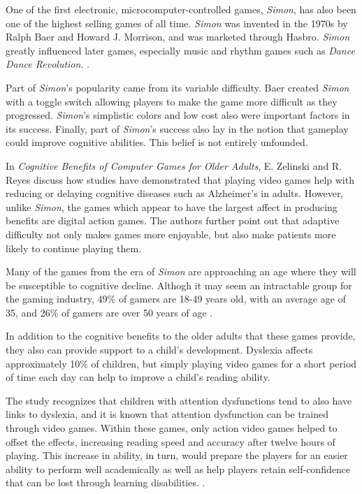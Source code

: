One of the first electronic, microcomputer-controlled games, \textit{Simon},
has also been one of the highest selling games of all time.  \textit{Simon}
was invented in the 1970s by Ralph Baer and Howard J. Morrison, and
was marketed through Hasbro.  \textit{Simon} greatly influenced later games,
especially music and rhythm games such as \textit{Dance Dance Revolution}.
\citep{austin2016}.

Part of \textit{Simon}'s popularity came from its variable difficulty.  Baer
created \textit{Simon} with a toggle switch allowing players to make the game
more difficult as they progressed.  \textit{Simon}'s simplistic colors and low
cost also were important factors in its success.  Finally, part of
\textit{Simon}'s success also lay in the notion that gameplay could improve
cognitive abilities.  This belief is not entirely unfounded.

In \textit{Cognitive Benefits of Computer Games for Older Adults},
E. Zelinski and R. Reyes discuss how studies have demonstrated that playing video
games help with reducing or delaying cognitive diseases such as
Alzheimer’s in adults.  However, unlike \textit{Simon}, the games which appear
to have the largest affect in producing benefits are digital action games.
The authors further point out that adaptive difficulty not only makes
games more enjoyable, but also make patients more likely to continue
playing them.

Many of the games from the era of \textit{Simon} are approaching an age
where they will be susceptible to cognitive decline.  Althogh it
may seem an intractable group for the gaming industry, 49\% of gamers
are 18-49 years old, with an average age of 35, and 26\% of gamers are
over 50 years of age \citep{zelinski2009}.

In addition to the cognitive benefits to the older adults that these games
provide, they also can provide support to a child's development. Dyslexia
affects approximately 10\% of children, but simply playing video games for a
short period of time each day can help to improve a child's reading ability.

The study recognizes that children with attention dysfunctions tend to also
have links to dyslexia, and it is known that attention dysfunction can be
trained through video games. Within these games, only action video games helped
to offset the effects, increasing reading speed and accuracy after twelve hours
of playing. This increase in ability, in turn, would prepare the players for an
easier ability to perform well academically as well as help players retain
self-confidence that can be lost through learning disabilities.
\citep{franceschini2013}.

